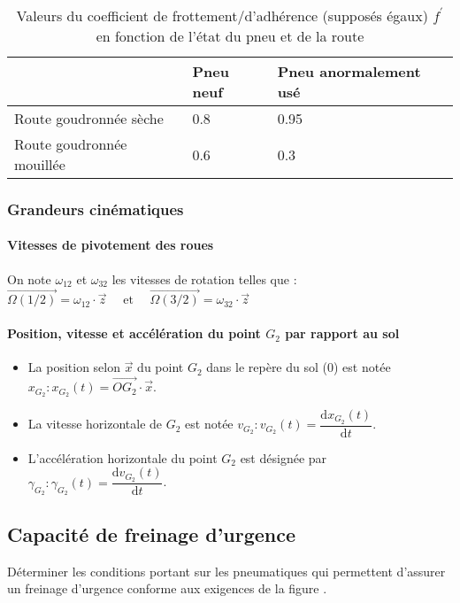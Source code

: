 \begin{table}[!h]
\centering
\begin{tabular}{lll}
 & \textbf{Pneu neuf} & \textbf{Pneu anormalement usé} \\
\hline
Route goudronnée sèche & 0.8 & 0.95 \\
Route goudronnée mouillée & 0.6 & 0.3 \\
\hline
\end{tabular}
\caption{Valeurs du coefficient de frottement/d'adhérence (supposés égaux) \(f^{\prime}\) en fonction de l'état du pneu et de la route \label{tab_33}}
\end{table}


\subsubsection{Grandeurs cinématiques}
\paragraph*{Vitesses de pivotement des roues} On note \(\omega_{12}\) et \(\omega_{32}\) les vitesses de rotation telles que :
$
\overrightarrow{\Omega(1 / 2)}=\omega_{12} \cdot \vec{z} \quad \text { et } \quad \overrightarrow{\Omega(3 / 2)}=\omega_{32} \cdot \vec{z}
$

\paragraph*{Position, vitesse et accélération du point \(G_{2}\) par rapport au sol}
\begin{itemize}
\item La position selon \(\vec{x}\) du point \(G_{2}\) dans le repère du sol (0) est notée \(x_{G_{2}}: x_{G_{2}}(t)=\overrightarrow{O G_{2}} \cdot \vec{x}\).
  \item La vitesse horizontale de \(G_{2}\) est notée \(v_{G_{2}}: v_{G_{2}}(t)=\dfrac{\mathrm{d} x_{G_{2}}(t)}{\mathrm{d} t}\).
  \item L'accélération horizontale du point \(G_{2}\) est désignée par \(\gamma_{G_{2}}: \gamma_{G_{2}}(t)=\dfrac{\mathrm{d} v_{G_{2}}(t)}{\mathrm{d} t}\).
\end{itemize}

\subsection{Capacité de freinage d'urgence}
\begin{obj}
Déterminer les conditions portant sur les pneumatiques qui permettent d'assurer un freinage d'urgence conforme aux exigences de la figure \label{fig_31}.
\end{obj}

